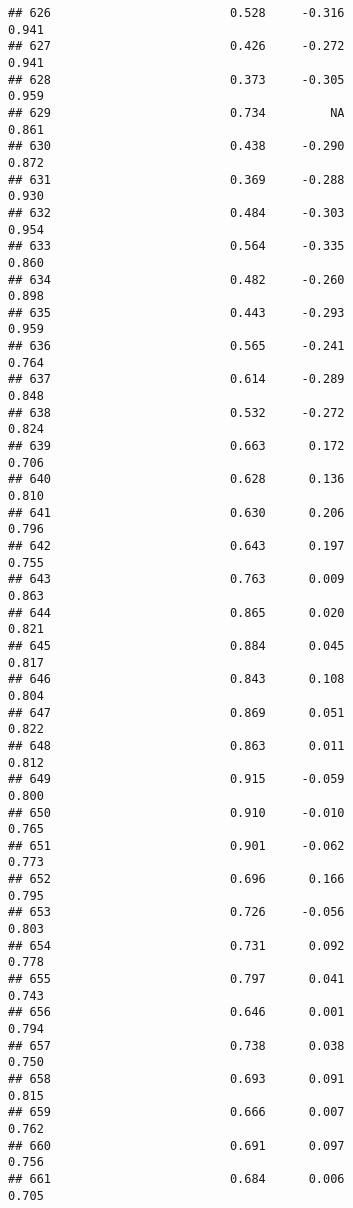 \documentclass[
]{article}
\begin{document}
\begin{verbatim}
## 626                         0.528     -0.316                     0.941
## 627                         0.426     -0.272                     0.941
## 628                         0.373     -0.305                     0.959
## 629                         0.734         NA                     0.861
## 630                         0.438     -0.290                     0.872
## 631                         0.369     -0.288                     0.930
## 632                         0.484     -0.303                     0.954
## 633                         0.564     -0.335                     0.860
## 634                         0.482     -0.260                     0.898
## 635                         0.443     -0.293                     0.959
## 636                         0.565     -0.241                     0.764
## 637                         0.614     -0.289                     0.848
## 638                         0.532     -0.272                     0.824
## 639                         0.663      0.172                     0.706
## 640                         0.628      0.136                     0.810
## 641                         0.630      0.206                     0.796
## 642                         0.643      0.197                     0.755
## 643                         0.763      0.009                     0.863
## 644                         0.865      0.020                     0.821
## 645                         0.884      0.045                     0.817
## 646                         0.843      0.108                     0.804
## 647                         0.869      0.051                     0.822
## 648                         0.863      0.011                     0.812
## 649                         0.915     -0.059                     0.800
## 650                         0.910     -0.010                     0.765
## 651                         0.901     -0.062                     0.773
## 652                         0.696      0.166                     0.795
## 653                         0.726     -0.056                     0.803
## 654                         0.731      0.092                     0.778
## 655                         0.797      0.041                     0.743
## 656                         0.646      0.001                     0.794
## 657                         0.738      0.038                     0.750
## 658                         0.693      0.091                     0.815
## 659                         0.666      0.007                     0.762
## 660                         0.691      0.097                     0.756
## 661                         0.684      0.006                     0.705

\end{verbatim}
\end{document}
